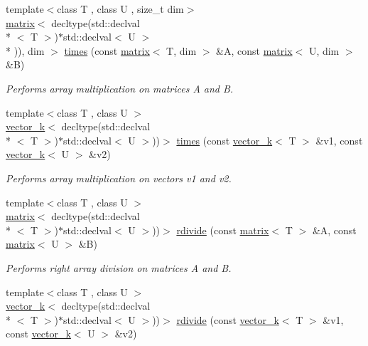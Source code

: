 \begin{DoxyCompactItemize}
\item 
{\footnotesize template$<$class T , class U , size\-\_\-t dim$>$ }\\\hyperlink{classkeycpp_1_1matrix}{matrix}$<$ decltype(std\-::declval\\*
$<$ T $>$)$\ast$std\-::declval$<$ U $>$\\*
)), dim $>$ \hyperlink{namespacekeycpp_a23a0fd48168263aad7f77f1769dc2f2a}{times} (const \hyperlink{classkeycpp_1_1matrix}{matrix}$<$ T, dim $>$ \&A, const \hyperlink{classkeycpp_1_1matrix}{matrix}$<$ U, dim $>$ \&B)
\begin{DoxyCompactList}\small\item\em Performs array multiplication on matrices A and B. \end{DoxyCompactList}\item 
{\footnotesize template$<$class T , class U $>$ }\\\hyperlink{classkeycpp_1_1vector__k}{vector\-\_\-k}$<$ decltype(std\-::declval\\*
$<$ T $>$)$\ast$std\-::declval$<$ U $>$))$>$ \hyperlink{namespacekeycpp_aab613a4c8cc04981045fdea358931780}{times} (const \hyperlink{classkeycpp_1_1vector__k}{vector\-\_\-k}$<$ T $>$ \&v1, const \hyperlink{classkeycpp_1_1vector__k}{vector\-\_\-k}$<$ U $>$ \&v2)
\begin{DoxyCompactList}\small\item\em Performs array multiplication on vectors v1 and v2. \end{DoxyCompactList}\item 
{\footnotesize template$<$class T , class U $>$ }\\\hyperlink{classkeycpp_1_1matrix}{matrix}$<$ decltype(std\-::declval\\*
$<$ T $>$)$\ast$std\-::declval$<$ U $>$))$>$ \hyperlink{namespacekeycpp_aacd37d195541b2313b753b6e8839f916}{rdivide} (const \hyperlink{classkeycpp_1_1matrix}{matrix}$<$ T $>$ \&A, const \hyperlink{classkeycpp_1_1matrix}{matrix}$<$ U $>$ \&B)
\begin{DoxyCompactList}\small\item\em Performs right array division on matrices A and B. \end{DoxyCompactList}\item 
{\footnotesize template$<$class T , class U $>$ }\\\hyperlink{classkeycpp_1_1vector__k}{vector\-\_\-k}$<$ decltype(std\-::declval\\*
$<$ T $>$)$\ast$std\-::declval$<$ U $>$))$>$ \hyperlink{namespacekeycpp_ab299ba9f0640c2f95fe2393f2eef6ed2}{rdivide} (const \hyperlink{classkeycpp_1_1vector__k}{vector\-\_\-k}$<$ T $>$ \&v1, const \hyperlink{classkeycpp_1_1vector__k}{vector\-\_\-k}$<$ U $>$ \&v2)

\end{DoxyCompactItemize}
